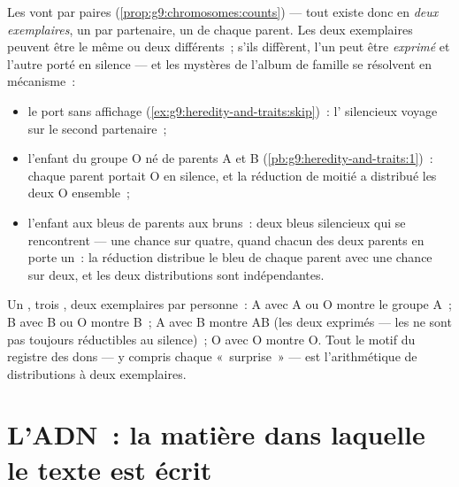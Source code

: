 \begin{proposition}\label{prop:g9:genes-and-dna:twocopies}
Les  vont par paires
(\cref{prop:g9:chromosomes:counts}) --- tout  existe
donc en \emph{deux exemplaires}, un par partenaire, un de
chaque parent. Les deux exemplaires peuvent être le même
 ou deux  différents~; s'ils diffèrent, l'un
peut être \emph{exprimé} et l'autre porté en silence --- et
les mystères de l'album de famille se résolvent en
mécanisme~:
\begin{itemize}
  \item le port sans affichage
        (\cref{ex:g9:heredity-and-traits:skip})~: l'
        silencieux voyage sur le second partenaire~;
  \item l'enfant du groupe O né de parents A et B
        (\cref{pb:g9:heredity-and-traits:1})~: chaque
        parent portait O en silence, et la réduction de
        moitié a distribué les deux O ensemble~;
  \item l'enfant aux  bleus de parents aux 
        bruns~: deux bleus silencieux qui se rencontrent
        --- une chance sur quatre, quand chacun des deux parents
        en porte un~: la réduction distribue le bleu de
        chaque parent avec une chance sur deux, et les deux
        distributions sont indépendantes.
\end{itemize}
\end{proposition}
\admitted

\begin{example}\label{ex:g9:genes-and-dna:bloodgroups}
Un , trois , deux exemplaires par personne~: A
avec A ou O montre le groupe A~; B avec B ou O montre B~; A
avec B montre AB (les deux exprimés --- les  ne sont
pas toujours réductibles au silence)~; O avec O montre O.
Tout le motif du registre des dons --- y compris chaque
«~surprise~» --- est l'arithmétique de distributions à deux
exemplaires.
\end{example}

\section{L'ADN~: la matière dans laquelle le texte est écrit}


